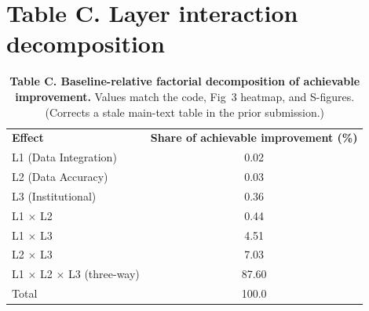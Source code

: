 \documentclass[10pt,letterpaper]{article}
\newlength\savedwidth
\newcommand\thickhline{\noalign{\global\savedwidth\arrayrulewidth\global\arrayrulewidth 2pt}\hline\noalign{\global\arrayrulewidth\savedwidth}}
\begin{document}
\section*{Table C. Layer interaction decomposition}
\begin{table}[!ht]\centering
\caption{{\bf Table C. Baseline-relative factorial decomposition of achievable improvement.} Values match the code, Fig~3 heatmap, and S-figures. (Corrects a stale main-text table in the prior submission.)}
\label{S3}
\begin{tabular}{l c}
\hline \textbf{Effect} & \textbf{Share of achievable improvement (\%)} \\ \thickhline
L1 (Data Integration) & 0.02 \\
L2 (Data Accuracy) & 0.03 \\
L3 (Institutional) & 0.36 \\ \hline
L1 $\times$ L2 & 0.44 \\
L1 $\times$ L3 & 4.51 \\
L2 $\times$ L3 & 7.03 \\ \hline
L1 $\times$ L2 $\times$ L3 (three-way) & 87.60 \\ \thickhline
Total & 100.0 \\ \hline
\end{tabular}
\end{table}

\end{document}
